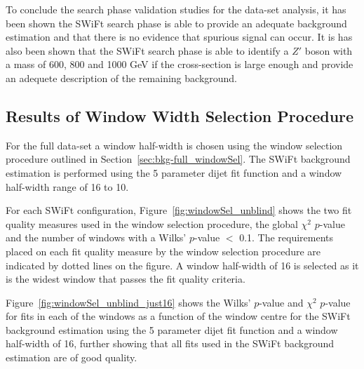 To conclude the search phase validation studies for the \lm{} data-set analysis,
it has been shown the SWiFt search phase is
able to provide an adequate background estimation 
and that there is no evidence that spurious signal can occur.
It is has also been shown that the SWiFt search phase is able to identify a
$Z'$ boson with a mass of 600, 800 and 1000 GeV if the cross-section is large enough
and provide an adequete description of the remaining background.

\subsection{Results of Window Width Selection Procedure}
\label{sec:bkg-full_windowSelResults}

For the full \lm{} data-set a window half-width is chosen using the window selection procedure outlined in Section~\ref{sec:bkg-full_windowSel}.
The SWiFt background estimation is performed using the 5 parameter dijet fit function and a window half-width range of 16 to 10.

For each SWiFt configuration, Figure~\ref{fig:windowSel_unblind} shows the two fit quality measures used in the window selection procedure,
the global $\chi^2$ $p$-value and the number of windows with a Wilks' $p$-value $<$ 0.1.
The requirements placed on each fit quality measure by the window selection procedure are indicated by dotted lines on the figure.
A window half-width of 16 is selected as it is the widest window that passes the fit quality criteria.

Figure~\ref{fig:windowSel_unblind_just16} shows the Wilks' $p$-value and $\chi^2$ $p$-value for fits in each of the windows
as a function of the window centre for the SWiFt background estimation using the 5 parameter dijet fit function and a window half-width of 16,
further showing that all fits used in the SWiFt background estimation are of good quality.

